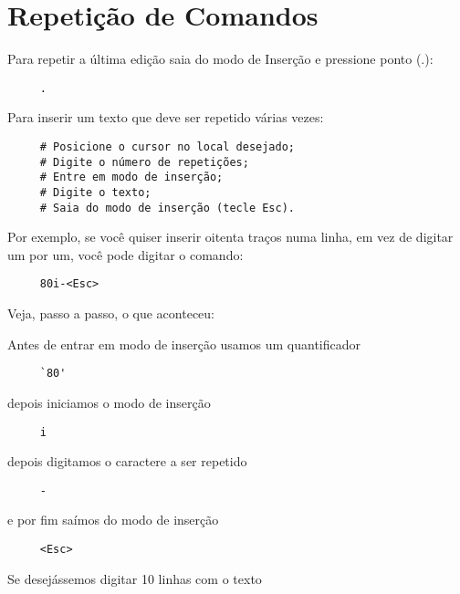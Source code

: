 
\chapter{Repetição de Comandos}\label{Repetição de comandos}

Para repetir a última edição saia do modo de Inserção e pressione ponto (.):

\begin{verbatim}
     .
\end{verbatim}

Para inserir um texto que deve ser repetido várias vezes:

\begin{verbatim}
     # Posicione o cursor no local desejado;
     # Digite o número de repetições;
     # Entre em modo de inserção;
     # Digite o texto;
     # Saia do modo de inserção (tecle Esc).
\end{verbatim}

Por exemplo, se você quiser inserir oitenta traços numa linha, em vez
de digitar um por um, você pode digitar o comando:

\begin{verbatim}
     80i-<Esc>
\end{verbatim}

Veja, passo a passo, o que aconteceu:

 Antes de entrar em modo de inserção usamos um quantificador

\begin{verbatim}
     `80'
\end{verbatim}

 depois iniciamos o modo de inserção

\begin{verbatim}
     i
\end{verbatim}

depois digitamos o caractere a ser repetido

\begin{verbatim}
     -
\end{verbatim}

e por fim saímos do modo de inserção

\begin{verbatim}
     <Esc>
\end{verbatim}

Se desejássemos digitar 10 linhas com o texto

